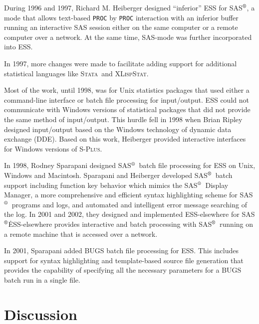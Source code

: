 \documentclass{article}
\newcommand*{\SAS}{\textsc{SAS}$^{\mbox{\scriptsize\textregistered}}$}
\newcommand*{\Splus}{\textsc{S-Plus}}
\newcommand*{\XLispStat}{\textsc{XLispStat}}
\newcommand*{\Stata}{\textsc{Stata}}
\newcommand{\stexttt}[1]{{\small\texttt{#1}}}
\begin{document}
During 1996 and 1997, Richard M. Heiberger designed ``inferior'' ESS
for \SAS, a mode that allows text-based \stexttt{PROC} by
\stexttt{PROC} interaction with an inferior buffer running an interactive SAS
session either on the same computer or a remote computer over a network.  
At the same time, SAS-mode was further incorporated into ESS.

In 1997, more changes were made to facilitate
adding support for additional statistical languages like \Stata\ and
\XLispStat.

Most of the work, until 1998, was for Unix statistics
packages that used either a command-line interface or batch file
processing for input/output.  ESS could not communicate 
with Windows versions of statistical packages that did not provide
the same method of input/output.  This hurdle
fell in 1998 when Brian Ripley designed input/output based on
the Windows technology of dynamic data exchange (DDE).  
Based on this work, Heiberger provided interactive interfaces
for Windows versions of \Splus.

In 1998, Rodney Sparapani designed \SAS\ batch file processing for ESS
on Unix, Windows and Macintosh.
Sparapani and Heiberger developed \SAS\ batch support including function
key behavior which mimics the \SAS\ Display Manager,
a more comprehensive and efficient syntax highlighting scheme for \SAS\ 
programs and logs, and automated and intelligent error message searching
of the log.  In 2001 and 2002, they designed and implemented ESS-elsewhere
for \SAS\.  ESS-elsewhere provides interactive and batch processing
with \SAS\ running on a remote machine that is accessed over a 
network. 

In 2001, Sparapani added BUGS batch file processing for ESS.  This
includes support for syntax highlighting and template-based source file
generation that provides the capability of specifying all the necessary
parameters for a BUGS batch run in a single file.

\section{Discussion}
\label{sec:discussion}
\end{document}
